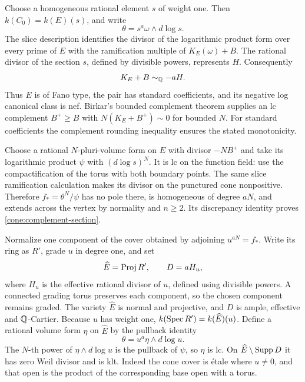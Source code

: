 Choose a homogeneous rational element $s$ of weight one.  Then
$k(C_0)=k(E)(s)$, and write
\[
 \theta=s^a\omega\wedge d\log s.
\]
The slice description identifies the divisor of the logarithmic product
form over every prime of $E$ with the ramification multiple of
$K_E(\omega)+B$.  The rational divisor of the section $s$, defined by
divisible powers, represents $H$.  Consequently
\begin{equation}\label{cone:fano-quotient}
 K_E+B\sim_{\mathbb Q}-aH.
\end{equation}
Thus $E$ is of Fano type, the pair has standard coefficients, and its
negative log canonical class is nef.  Birkar's bounded complement
theorem \cite[Theorem~1.7]{BirkarComplements} supplies an lc complement
$B^+\geq B$ with $N(K_E+B^+)\sim0$ for bounded $N$.  For standard
coefficients the complement rounding inequality ensures the stated
monotonicity.

Choose a rational $N$-pluri-volume form on $E$ with divisor $-NB^+$ and
take its logarithmic product $\psi$ with $(d\log s)^N$.  It is lc on
the function field: use the compactification of the torus with both
boundary points.  The same slice ramification calculation makes its
divisor on the punctured cone nonpositive.  Therefore
$f_*=\theta^N/\psi$ has no pole there, is homogeneous of degree $aN$,
and extends across the vertex by normality and $n\geq2$.  Its
discrepancy identity proves \eqref{cone:complement-section}.

Normalize one component of the cover obtained by adjoining
$u^{aN}=f_*$.  Write its ring as $R'$, grade $u$ in degree one, and set
\begin{equation}\label{cone:slice-data}
 \widehat E=\operatorname{Proj} R',\qquad D=aH_u,
\end{equation}
where $H_u$ is the effective rational divisor of $u$, defined using
divisible powers.  A connected grading torus preserves each component,
so the chosen component remains graded.  The variety $\widehat E$ is
normal and projective, and $D$ is ample, effective and $\mathbb Q$-Cartier.
Because $u$ has weight one,
$k(\operatorname{Spec} R')=k(\widehat E)(u)$.  Define a rational volume form $\eta$
on $\widehat E$ by the pullback identity
\begin{equation}\label{cone:slice-form}
 \theta=u^a\eta\wedge d\log u.
\end{equation}
The $N$-th power of $\eta\wedge d\log u$ is the pullback of $\psi$,
so $\eta$ is lc.  On $\widehat E\setminus\operatorname{Supp} D$ it has zero Weil
divisor and is klt.  Indeed the cone cover is \'etale where $u\ne0$,
and that open is the product of the corresponding base open with a
torus.

